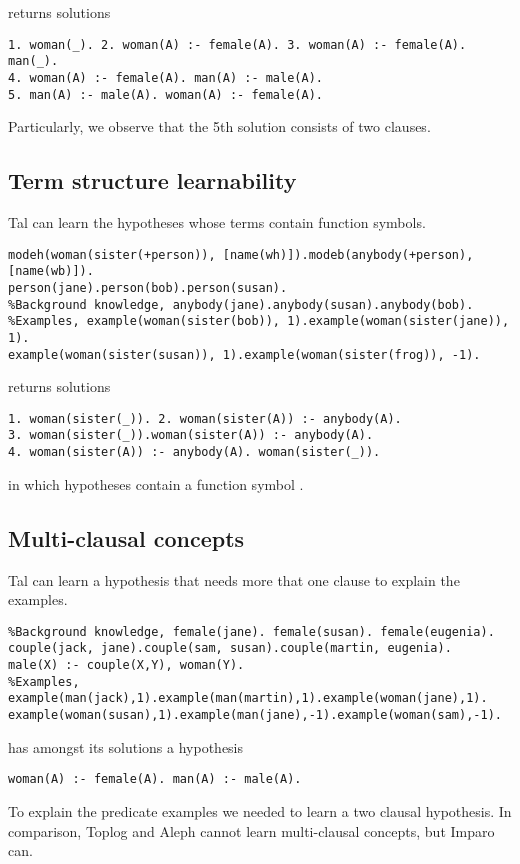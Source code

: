 returns solutions
\begin{lstlisting}
1. woman(_). 2. woman(A) :- female(A). 3. woman(A) :- female(A). man(_).
4. woman(A) :- female(A). man(A) :- male(A).
5. man(A) :- male(A). woman(A) :- female(A).
\end{lstlisting}

Particularly, we observe that the 5th solution consists of two clauses.

\subsection{Term structure learnability}
Tal can learn the hypotheses whose terms contain function symbols.
\begin{lstlisting}
modeh(woman(sister(+person)), [name(wh)]).modeb(anybody(+person), [name(wb)]).
person(jane).person(bob).person(susan).
%Background knowledge, anybody(jane).anybody(susan).anybody(bob).
%Examples, example(woman(sister(bob)), 1).example(woman(sister(jane)), 1).
example(woman(sister(susan)), 1).example(woman(sister(frog)), -1).
\end{lstlisting}
returns solutions
\begin{lstlisting}
1. woman(sister(_)). 2. woman(sister(A)) :- anybody(A).
3. woman(sister(_)).woman(sister(A)) :- anybody(A).
4. woman(sister(A)) :- anybody(A). woman(sister(_)).
\end{lstlisting}

in which hypotheses contain a function symbol .

\subsection{Multi-clausal concepts}
Tal can learn a hypothesis that needs more that one clause to explain the examples.
\begin{lstlisting}
%Background knowledge, female(jane). female(susan). female(eugenia).
couple(jack, jane).couple(sam, susan).couple(martin, eugenia).
male(X) :- couple(X,Y), woman(Y).
%Examples, example(man(jack),1).example(man(martin),1).example(woman(jane),1).
example(woman(susan),1).example(man(jane),-1).example(woman(sam),-1).
\end{lstlisting}
has amongst its solutions a hypothesis
\begin{lstlisting}
woman(A) :- female(A). man(A) :- male(A).
\end{lstlisting}
To explain the  predicate examples we needed to learn a two clausal hypothesis. In comparison, Toplog and Aleph cannot learn multi-clausal concepts, but Imparo can.

